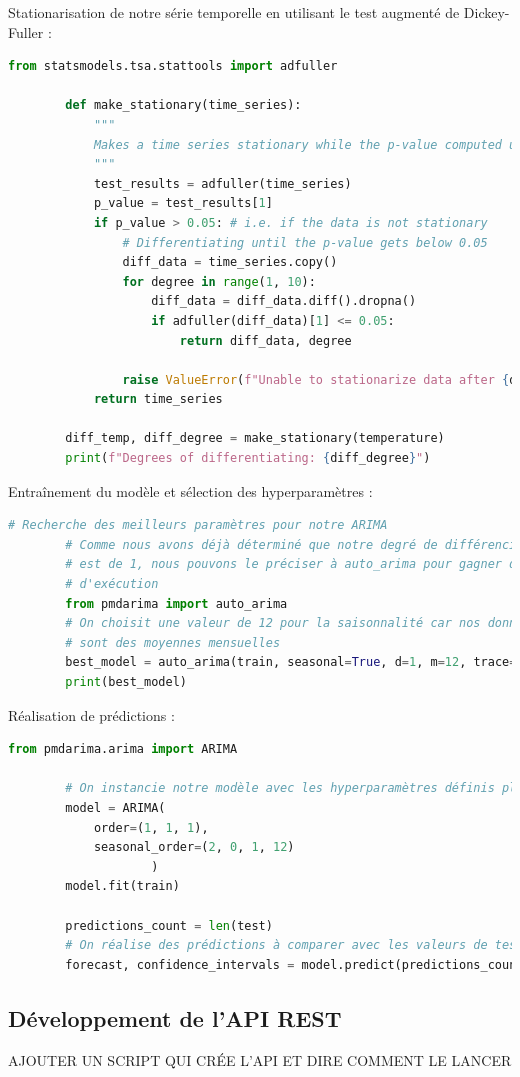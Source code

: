 \documentclass[french]{article}
\begin{document}
    Stationarisation de notre série temporelle en utilisant le test augmenté de Dickey-Fuller :
    \begin{lstlisting}[language=Python]
        from statsmodels.tsa.stattools import adfuller
    
        def make_stationary(time_series):
            """
            Makes a time series stationary while the p-value computed using the ADF test is higher than 0.05
            """
            test_results = adfuller(time_series)
            p_value = test_results[1]
            if p_value > 0.05: # i.e. if the data is not stationary
                # Differentiating until the p-value gets below 0.05
                diff_data = time_series.copy()
                for degree in range(1, 10):
                    diff_data = diff_data.diff().dropna()
                    if adfuller(diff_data)[1] <= 0.05:
                        return diff_data, degree
                
                raise ValueError(f"Unable to stationarize data after {degree} times")
            return time_series
        
        diff_temp, diff_degree = make_stationary(temperature)
        print(f"Degrees of differentiating: {diff_degree}")
    \end{lstlisting}

    Entraînement du modèle et sélection des hyperparamètres :
    \begin{lstlisting}[language=Python]
        # Recherche des meilleurs paramètres pour notre ARIMA
        # Comme nous avons déjà déterminé que notre degré de différenciation
        # est de 1, nous pouvons le préciser à auto_arima pour gagner du temps
        # d'exécution
        from pmdarima import auto_arima
        # On choisit une valeur de 12 pour la saisonnalité car nos données
        # sont des moyennes mensuelles
        best_model = auto_arima(train, seasonal=True, d=1, m=12, trace=True)
        print(best_model)
        \end{lstlisting}
    
    Réalisation de prédictions :
    \begin{lstlisting}[language=Python]
        from pmdarima.arima import ARIMA
    
        # On instancie notre modèle avec les hyperparamètres définis plus tôt
        model = ARIMA(
            order=(1, 1, 1),
            seasonal_order=(2, 0, 1, 12)
                    )
        model.fit(train)
    
        predictions_count = len(test)
        # On réalise des prédictions à comparer avec les valeurs de test
        forecast, confidence_intervals = model.predict(predictions_count, return_conf_int=True) 
        \end{lstlisting}
    \subsection*{Développement de l'API REST}
    AJOUTER UN SCRIPT QUI CRÉE L'API ET DIRE COMMENT LE LANCER

    
\end{document}
